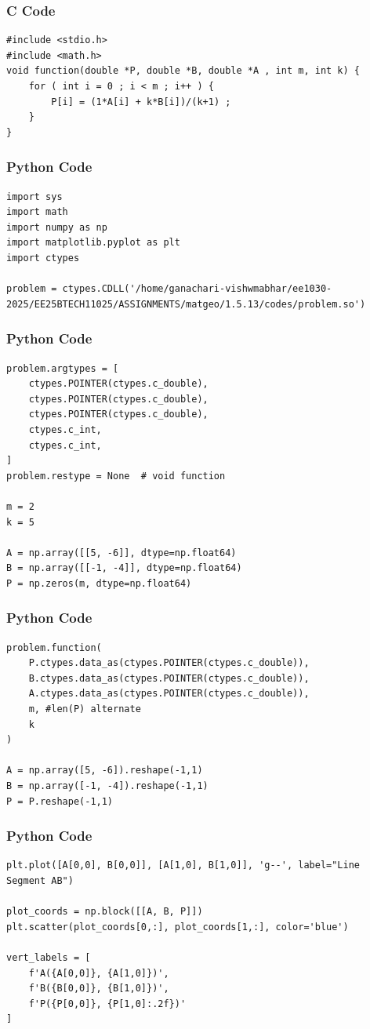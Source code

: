 \documentclass{beamer}
\begin{document}
\begin{frame}[fragile]
    \frametitle{C Code}
    \begin{lstlisting}
#include <stdio.h>
#include <math.h>
void function(double *P, double *B, double *A , int m, int k) {
    for ( int i = 0 ; i < m ; i++ ) {
        P[i] = (1*A[i] + k*B[i])/(k+1) ; 
    }
}
    \end{lstlisting}
\end{frame}

\begin{frame}[fragile]
    \frametitle{Python Code}
    \begin{lstlisting}
import sys
import math
import numpy as np
import matplotlib.pyplot as plt
import ctypes

problem = ctypes.CDLL('/home/ganachari-vishwmabhar/ee1030-2025/EE25BTECH11025/ASSIGNMENTS/matgeo/1.5.13/codes/problem.so')
    \end{lstlisting}
\end{frame}

\begin{frame}[fragile]
    \frametitle{Python Code}
    \begin{lstlisting}
problem.argtypes = [
    ctypes.POINTER(ctypes.c_double),
    ctypes.POINTER(ctypes.c_double),
    ctypes.POINTER(ctypes.c_double),
    ctypes.c_int,
    ctypes.c_int,
]
problem.restype = None  # void function

m = 2
k = 5

A = np.array([[5, -6]], dtype=np.float64)
B = np.array([[-1, -4]], dtype=np.float64)
P = np.zeros(m, dtype=np.float64)

    \end{lstlisting}
\end{frame}

\begin{frame}[fragile]
    \frametitle{Python Code}
    \begin{lstlisting}
problem.function(
    P.ctypes.data_as(ctypes.POINTER(ctypes.c_double)),
    B.ctypes.data_as(ctypes.POINTER(ctypes.c_double)),
    A.ctypes.data_as(ctypes.POINTER(ctypes.c_double)),
    m, #len(P) alternate
    k
)

A = np.array([5, -6]).reshape(-1,1)
B = np.array([-1, -4]).reshape(-1,1)
P = P.reshape(-1,1)
    \end{lstlisting}
\end{frame}

\begin{frame}[fragile]
    \frametitle{Python Code}
    \begin{lstlisting}
plt.plot([A[0,0], B[0,0]], [A[1,0], B[1,0]], 'g--', label="Line Segment AB")

plot_coords = np.block([[A, B, P]])
plt.scatter(plot_coords[0,:], plot_coords[1,:], color='blue')

vert_labels = [
    f'A({A[0,0]}, {A[1,0]})',
    f'B({B[0,0]}, {B[1,0]})',
    f'P({P[0,0]}, {P[1,0]:.2f})'
]
    \end{lstlisting}
\end{frame}
\end{document}

